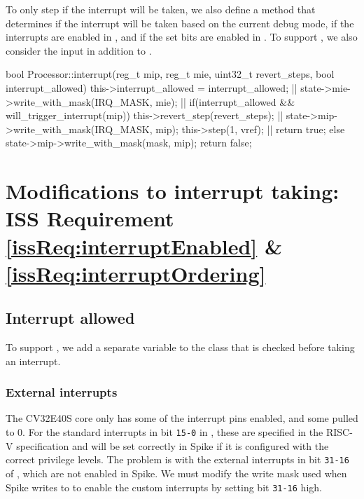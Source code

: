 \begin{sloppypar}
To only step if the interrupt will be taken, we also define a  method that determines if the interrupt will be taken based on the current debug mode, if the interrupts are enabled in , and if the set  bits are enabled in . To support , we also consider the  input in addition to  .
\end{sloppypar}

\begin{clisting}[label=lst:interrupt, caption=The function used to apply interrupt in spike.,escapechar=|]
bool Processor::interrupt(reg_t mip, reg_t mie, uint32_t revert_steps, bool interrupt_allowed) {
  this->interrupt_allowed = interrupt_allowed; |\label{line:interrupt_allowed}|
  state->mie->write_with_mask(IRQ_MASK, mie); |\label{line:mie}|
  if(interrupt_allowed && will_trigger_interrupt(mip)) {
    this->revert_step(revert_steps); |\label{line:revert}|
    state->mip->write_with_mask(IRQ_MASK, mip);
    this->step(1, vref); |\label{line:step}|
    return true;
  } else {
    state->mip->write_with_mask(mask, mip);
    return false;
  }
} 
\end{clisting}

\section{Modifications to interrupt taking: ISS Requirement \ref{issReq:interruptEnabled} \& \ref{issReq:interruptOrdering}}
\label{sec:iss_interruptModifications}

\subsection{Interrupt allowed}

To support , we add a separate  variable to the  class that is checked before taking an interrupt. 

\subsubsection{External interrupts}

The CV32E40S core only has some of the interrupt pins enabled, and some pulled to 0\cite{openhwgroupExceptionsInterruptsCOREV2023}. For the standard interrupts in bit \texttt{15-0} in , these are specified in the RISC-V specification \cite{watermanRISCVInstructionSet2021} and will be set correctly in Spike if it is configured with the correct privilege levels.
The problem is with the external interrupts in bit \texttt{31-16} of , which are not enabled in Spike. We must modify the write mask used when Spike writes to  to enable the custom interrupts by setting bit \texttt{31-16} high.

